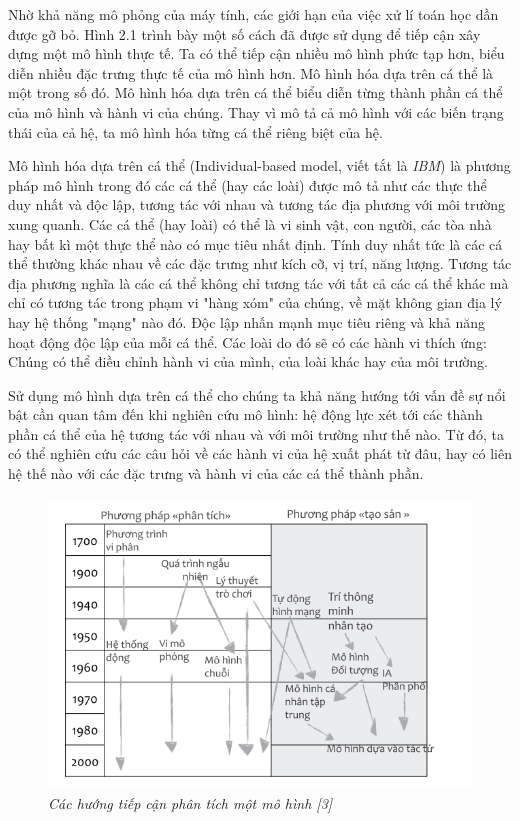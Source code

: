 \documentclass[13pt]{extreport}
\begin{document}
Nhờ khả năng mô phỏng của máy tính, các giới hạn của việc xử lí toán học dần được gỡ bỏ. Hình 2.1 trình bày một số cách đã được sử dụng để tiếp cận xây dựng một mô hình thực tế. Ta có thể tiếp cận nhiều mô hình phức tạp hơn, biểu diễn nhiều đặc trưng thực tế của mô hình hơn. Mô hình hóa dựa trên cá thể là một trong số đó. Mô hình hóa dựa trên cá thể biểu diễn từng thành phần cá thể của mô hình và hành vi của chúng. Thay vì mô tả cả mô hình  với các biến trạng thái của cả hệ, ta mô hình hóa từng cá thể riêng biệt của hệ.

Mô hình hóa dựa trên cá thể (Individual-based model, viết tắt là \textit{IBM}) là phương pháp mô hình trong đó các cá thể (hay các loài) được mô tả như các thực thể duy nhất và độc lập, tương tác với nhau và tương tác địa phương với môi trường xung quanh. Các cá thể (hay loài) có thể là vi sinh vật, con người, các tòa nhà hay bất kì một thực thể nào có mục tiêu nhất định. Tính duy nhất tức là các cá thể thường khác nhau về các đặc trưng như kích cỡ, vị trí, năng lượng. Tương tác địa phương nghĩa là các cá thể không chỉ tương tác với tất cả các cá thể khác mà chỉ có tương tác trong phạm vi "hàng xóm" của chúng, về mặt không gian địa lý hay hệ thống "mạng" nào đó. Độc lập nhấn mạnh mục tiêu riêng và khả năng hoạt động độc lập của mỗi cá thể. Các loài do đó sẽ có các hành vi thích ứng: Chúng có thể điều chỉnh hành vi của mình, của loài khác hay của môi trường. 

Sử dụng mô hình dựa trên cá thể cho chúng ta khả năng hướng tới vấn đề sự nổi bật cần quan tâm đến khi nghiên cứu mô hình: hệ động lực xét tới các thành phần cá thể của hệ tương tác với nhau và với môi trường như thế nào. Từ đó, ta có thể nghiên cứu các câu hỏi về các hành vi của hệ xuất phát từ đâu, hay có liên hệ thế nào với các đặc trưng và hành vi của các cá thể thành phần.

\begin{figure}
\begin{center}
\includegraphics[scale=0.7]{huongmh}
\end{center}
\caption{\textit{ Các hướng tiếp cận phân tích một mô hình [3]}}
\end{figure}
\end{document}
